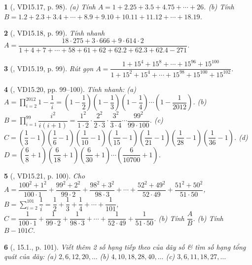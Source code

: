 \documentclass{article}
\newtheorem{baitoan}{}
\begin{document}
\begin{baitoan}[\cite{TLCT_THCS_Toan_6_so_hoc}, VD15.17, p. 98]
	(a) Tính $A = 1 + 2.25 + 3.5 + 4.75 + \cdots + 26$. (b) Tính $B = 1.2 + 2.3 + 3.4 + \cdots + 8.9 + 9.10 + 10.11 + 11.12 + \cdots + 18.19$.
\end{baitoan}

\begin{baitoan}[\cite{TLCT_THCS_Toan_6_so_hoc}, VD15.18, p. 99]
	Tính nhanh $A = \dfrac{18\cdot275 + 3\cdot666 + 9\cdot614\cdot2}{1 + 4 + 7 + \cdots + 58 + 61 + 62 + 62.2 + 62.3 + 62.4 - 271}$.
\end{baitoan}

\begin{baitoan}[\cite{TLCT_THCS_Toan_6_so_hoc}, VD15.19, p. 99]
	Rút gọn $A = \dfrac{1 + 15^4 + 15^8 + \cdots + 15^{96} + 15^{100}}{1 + 15^2 + 15^4 + \cdots + 15^{98} + 15^{100} + 15^{102}}$.
\end{baitoan}

\begin{baitoan}[\cite{TLCT_THCS_Toan_6_so_hoc}, VD15.20, pp. 99--100]
	Tính nhanh: (a) $A = \prod_{i=2}^{2012} 1  - \dfrac{1}{i} = \left(1 - \dfrac{1}{2}\right)\left(1 - \dfrac{1}{3}\right)\left(1 - \dfrac{1}{4}\right)\cdots\left(1 - \dfrac{1}{2012}\right)$. (b) $B = \prod_{i=1}^{99} \dfrac{i^2}{i(i + 1)} = \dfrac{1^2}{1\cdot2}\cdot\dfrac{2^2}{2\cdot3}\cdot\dfrac{3^2}{3\cdot4}\cdots\dfrac{99^2}{99\cdot100}$. (c) $C = \left(\dfrac{1}{3} - 1\right)\left(\dfrac{1}{6} - 1\right)\left(\dfrac{1}{10} - 1\right)\left(\dfrac{1}{15} - 1\right)\left(\dfrac{1}{21} - 1\right)\left(\dfrac{1}{28} - 1\right)\left(\dfrac{1}{36} - 1\right)$. (d) $D = \left(\dfrac{6}{8} + 1\right)\left(\dfrac{6}{18} + 1\right)\left(\dfrac{6}{30} + 1\right)\cdots\left(\dfrac{6}{10700} + 1\right)$.
\end{baitoan}

\begin{baitoan}[\cite{TLCT_THCS_Toan_6_so_hoc}, VD15.21, p. 100]
	Cho $A = \dfrac{100^2 + 1^2}{100\cdot1} + \dfrac{99^2 + 2^2}{99\cdot2} + \dfrac{98^2 + 3^2}{98\cdot3} + \cdots + \dfrac{52^2 + 49^2}{52\cdot49} + \dfrac{51^2 + 50^2}{51\cdot50}$, $B = \sum_{i=2}^{101} \dfrac{1}{i} = \dfrac{1}{2} + \dfrac{1}{3} + \dfrac{1}{4} + \cdots + \dfrac{1}{101}$, $C = \dfrac{1}{100\cdot1} + \dfrac{1}{99\cdot2} + \dfrac{1}{98\cdot3} + \cdots + \dfrac{1}{52\cdot49} + \dfrac{1}{51\cdot50}$. (b) Tính $\dfrac{A}{B}$. (b) Tính $B - 101C$.
\end{baitoan}

\begin{baitoan}[\cite{TLCT_THCS_Toan_6_so_hoc}, 15.1., p. 101]
	Viết thêm 2 số hạng tiếp theo của dãy số \& tìm số hạng tổng quát của dãy: (a) $2,6,12,20,\ldots$ (b) $4,10,18,28,40,\ldots$ (c) $3,6,11,18,27,\ldots$
\end{baitoan}
\end{document}
